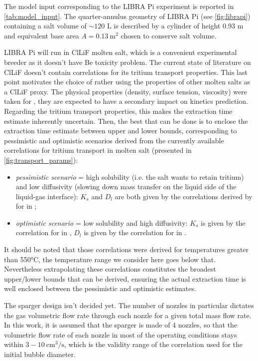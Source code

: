 \documentclass[a4paper,11pt,oneside]{report}
\begin{document}
The model input corresponding to the LIBRA Pi experiment is reported in \cref{tab:model_input}. The quarter-annulus geometry of LIBRA Pi (see \cref{fig:librapi}) containing a salt volume of $\sim120$ L is described by a cylinder of height 0.93 m and equivalent base area $A=0.13 \ \mathrm{m^2}$ chosen to conserve salt volume. 

LIBRA Pi will run in ClLiF molten salt, which is a convenient experimental breeder as it doesn't have Be toxicity problem. The current state of literature on ClLiF doesn't contain correlations for its tritium transport properties. This last point motivates the choice of rather using the properties of other molten salts as a ClLiF proxy. The physical properties (density, surface tension, viscosity) were taken for , they are expected to have a secondary impact on kinetics prediction. Regarding the tritium transport properties, this makes the extraction time estimate inherently uncertain. Then, the best that can be done is to enclose the extraction time estimate between upper and lower bounds, corresponding to pessimistic and optimistic scenarios derived from the currently available correlations for tritium transport in molten salt (presented in \cref{fig:transport_params}):
\begin{itemize}
    \item \textit{pessimistic scenario} = high solubility (i.e. the salt wants to retain tritium) and low diffusivity (slowing down mass transfer on the liquid side of the liquid-gas interface): $K_s$ and $D_l$ are both given by the correlations derived by \textcite{calderoni_measurement_2008} for  in ;
    \item \textit{optimistic scenario} = low solubility and high diffusivity: $K_s$ is given by the \textcite{malinauskas_solubilities_1974} correlation for  in , $D_l$ is given by the \textcite{fukada_hydrogen_2006} correlation for  in . 
\end{itemize}

It should be noted that those correlations were derived for temperatures greater than 550°C, the temperature range we consider here goes below that. Nevertheless extrapolating these correlations constitutes the broadest upper/lower bounds that can be derived, ensuring the actual extraction time is well enclosed between the pessimistic and optimistic estimates. 

The sparger design isn't decided yet. The number of nozzles in particular dictates the gas volumetric flow rate through each nozzle for a given total mass flow rate. In this work, it is assumed that the sparger is made of 4 nozzles, so that the volumetric flow rate of each nozzle in most of the operating conditions stays within $3-10\ \mathrm{cm^3/s}$, which is the validity range of the correlation used for the initial bubble diameter\cite{kanai_establishment_2017}. 
\end{document}
